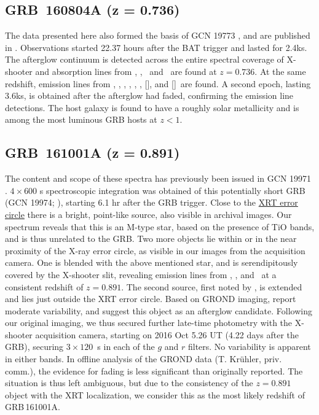\documentclass[longauth]{aa}    %
\begin{document}
\subsection{GRB~160804A (z = 0.736)}\label{160804}

The data presented here also formed the basis of GCN 19773 \citep{GCN19773}, and
are published in \citet{Heintz2017b}. Observations started 22.37 hours after the
BAT trigger and lasted for 2.4ks. The afterglow continuum is detected across the
entire spectral coverage of X-shooter and absorption lines from \mgi, \mgii,
\feii~and \alii~are found at $z = 0.736$. At the same redshift, emission lines
from \oii, \oiii, \ha, \hb, \hg, \niil, [\sii], and [\siii]~are found. A second epoch,
lasting 3.6ks, is obtained after the afterglow had faded, confirming the
emission line detections. The host galaxy is found to have a roughly solar
metallicity and is among the most luminous GRB hosts at $z < 1$.


\subsection{GRB~161001A (z = 0.891)}	\label{161001}

The content and scope of these spectra has previously been issued in GCN 19971
\citep{GCN19971}. $4 \times 600$ s spectroscopic integration was obtained of
this potentially short GRB (GCN 19974; \citealt{GCN19974}), starting 6.1 hr
after the GRB trigger. Close to the
\href{http://www.swift.ac.uk/xrt_positions/00020702/}{XRT error circle}
\citep{GCN19969} there is a bright, point-like source, also visible in archival
images. Our spectrum reveals that this is an M-type star, based on the presence
of TiO bands, and is thus unrelated to the GRB. Two more objects lie within or
in the near proximity of the X-ray error circle, as visible in our images from
the acquisition camera. One is blended with the above mentioned star, and is
serendipitously covered by the X-shooter slit, revealing emission lines from
\oii, \hb, and \ha~at a consistent redshift of $z = 0.891$. The second source,
first noted by \citet{GCN19975}, is extended and lies just outside the XRT error
circle. Based on GROND imaging, \citet{GCN19975} report moderate variability,
and suggest this object as an afterglow candidate. Following our original
imaging, we thus secured further late-time photometry with the X-shooter
acquisition camera, starting on 2016 Oct 5.26 UT (4.22 days after the GRB),
securing $3 \times 120$~s in each of the $g$ and $r$ filters. No variability is
apparent in either bands. In offline analysis of the GROND data (T. Kr\"uhler,
priv. comm.), the evidence for fading is less significant than originally
reported. The situation is thus left ambiguous, but due to the consistency of
the $z = 0.891$ object with the XRT localization, we consider this as the most
likely redshift of GRB\,161001A.
\end{document}

